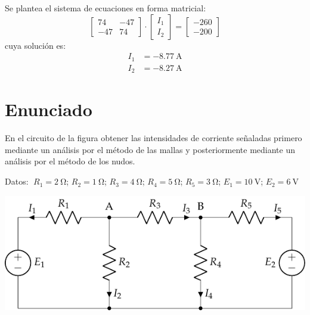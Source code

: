Se plantea el sistema de ecuaciones en forma matricial:
\begin{equation*}
  \begin{bmatrix}
    74 & -47  \\
    -47 & 74
  \end{bmatrix} \cdot
  \begin{bmatrix}
    I_1\\
    I_2
  \end{bmatrix} =
  \begin{bmatrix}
    -260 \\
    -200
  \end{bmatrix}
\end{equation*}
cuya solución es:
\begin{align*}
  I_1&=\qty{-8.77}{\ampere}\\
  I_2&=\qty{-8.27}{\ampere}
\end{align*}

\section{Enunciado}
En el circuito de la figura obtener las intensidades de corriente
señaladas primero mediante un análisis por el método de las mallas y
posteriormente mediante un análisis por el método de los nudos.

\vspace{2mm}
Datos: $\; R_1 = \qty{2}{\ohm}$;\; $R_2 = \qty{1}{\ohm}$;\; $R_3 = \qty{4}{\ohm}$;\; $R_4 = \qty{5}{\ohm}$;\; $R_5 = \qty{3}{\ohm}$;\; $E_1 = \qty{10}{\volt}$;\; $E_2 = \qty{6}{\volt}$

\begin{center}
  \includegraphics{figuras/BT1_08.pdf}
\end{center}
  

